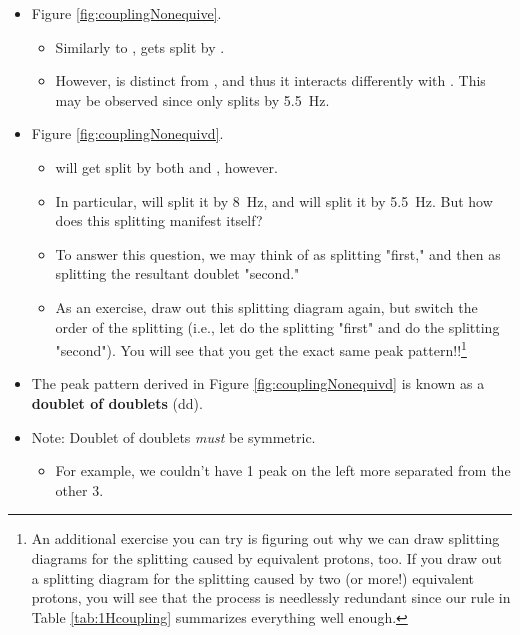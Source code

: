 \documentclass[../notes.tex]{subfiles}
\begin{document}
\begin{itemize}
\begin{itemize}
\begin{itemize}
            \item Experimentally, we observe that the coupling constant is \SI{8}{\hertz}.
        \end{itemize}
        \item Figure \ref{fig:couplingNonequive}.
        \begin{itemize}
            \item Similarly to ,  gets split by .
            \item However,  is distinct from , and thus it interacts differently with . This may be observed since  only splits  by \SI{5.5}{\hertz}.
        \end{itemize}
        \item Figure \ref{fig:couplingNonequivd}.
        \begin{itemize}
            \item {} will get split by both  and , however.
            \item In particular,  will split it by \SI{8}{\hertz}, and  will split it by \SI{5.5}{\hertz}. But how does this splitting manifest itself?
            \item To answer this question, we may think of  as splitting  "first," and then  as splitting the resultant doublet "second."
            \item As an exercise, draw out this splitting diagram again, but switch the order of the splitting (i.e., let  do the splitting "first" and  do the splitting "second"). You will see that you get the exact same peak pattern!!\footnote{An additional exercise you can try is figuring out why we can draw splitting diagrams for the splitting caused by equivalent protons, too. If you draw out a splitting diagram for the splitting caused by two (or more!) equivalent protons, you will see that the process is needlessly redundant since our rule in Table \ref{tab:1Hcoupling} summarizes everything well enough.}
        \end{itemize}
        \item The peak pattern derived in Figure \ref{fig:couplingNonequivd} is known as a \textbf{doublet of doublets} (dd).
        \item Note: Doublet of doublets \emph{must} be symmetric. 
        \begin{itemize}
            \item For example, we couldn't have 1 peak on the left more separated from the other 3.

\end{itemize}
\end{itemize}
\end{itemize}
\end{document}
